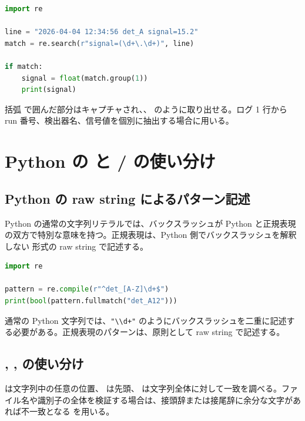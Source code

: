 \begin{lstlisting}[language=Python]
import re

line = "2026-04-04 12:34:56 det_A signal=15.2"
match = re.search(r"signal=(\d+\.\d+)", line)

if match:
    signal = float(match.group(1))
    print(signal)
\end{lstlisting}

括弧  で囲んだ部分はキャプチャされ、、 のように取り出せる。ログ 1 行から run 番号、検出器名、信号値を個別に抽出する場合に用いる。

\section{Python の  と / の使い分け}

\subsection{Python の raw string によるパターン記述}

Python の通常の文字列リテラルでは、バックスラッシュが Python と正規表現の双方で特別な意味を持つ。正規表現は、Python 側でバックスラッシュを解釈しない  形式の raw string で記述する。

\begin{lstlisting}[language=Python]
import re

pattern = re.compile(r"^det_[A-Z]\d+$")
print(bool(pattern.fullmatch("det_A12")))
\end{lstlisting}

通常の Python 文字列では、\texttt{"\textbackslash\textbackslash d+"} のようにバックスラッシュを二重に記述する必要がある。正規表現のパターンは、原則として raw string で記述する。

\subsection{, ,  の使い分け}

 は文字列中の任意の位置、 は先頭、 は文字列全体に対して一致を調べる。ファイル名や識別子の全体を検証する場合は、接頭辞または接尾辞に余分な文字があれば不一致となる  を用いる。

